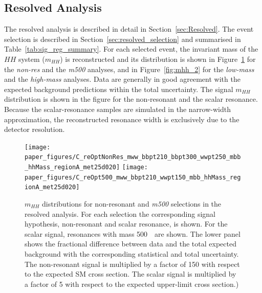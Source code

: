 \subsection{Resolved Analysis}
\label{sec:results}
 
The resolved analysis  is described in detail in
Section~\ref{sec:Resolved}. The event selection is described in
Section~\ref{sec:resolved_selection} and summarised in
Table~\ref{tab:sig_reg_summary}. For each selected event, the
invariant mass of the $HH$ system ($m_{HH}$) is reconstructed and its distribution is shown in Figure~\ref{fig:mhh_1} for the \emph{non-res} and the \emph{m500} analyses, and in Figure~\ref{fig:mhh_2} for the \emph{low-mass} and the \emph{high-mass} analyses.
Data are generally in good agreement with the expected
background predictions within the total uncertainty.
The signal $m_{HH}$ distribution is shown in the figure for the non-resonant and the scalar resonance.
Because the scalar-resonance samples are simulated in the narrow-width approximation,  the
reconstructed resonance width is exclusively due to the detector
resolution. 
 
\begin{figure}
\begin{center}
\texttt{[image: paper\_figures/C\_reOptNonRes\_mww\_bbpt210\_bbpt300\_wwpt250\_mbb\_hhMass\_regionA\_met25d020]}
\texttt{[image: paper\_figures/C\_reOpt500\_mww\_bbpt210\_wwpt150\_mbb\_hhMass\_regionA\_met25d020]}
\end{center}
\caption[$m_{HH}$ distributions for non-resonant and \emph{m500} selections in the resolved analysis]{$m_{HH}$ distributions for non-resonant and \emph{m500} selections in the resolved analysis. For each selection the corresponding signal hypothesis, non-resonant and scalar resonance, is shown. For the scalar signal, resonances with mass 500~\GeV\ are shown. The lower panel shows the fractional difference between data and the total expected background
 with the corresponding statistical and total uncertainty. The non-resonant signal is multiplied by a factor of 150 with respect to the expected SM cross section.  The scalar signal is multiplied by a factor of 5 with respect to the expected upper-limit cross section.)}%
\label{fig:mhh_1}
\end{figure}
 
